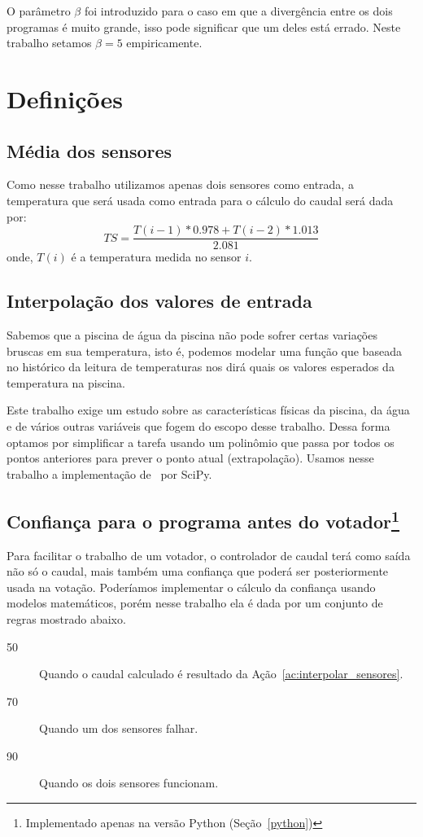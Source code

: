 \documentclass[a4paper,10pt]{article}
\begin{document}
O parâmetro $\beta$ foi introduzido para o caso em que a divergência entre os
dois programas é muito grande, isso pode significar que um deles está errado.
Neste trabalho setamos $\beta=5$ empiricamente.

\section{Definições}

\subsection{Média dos sensores}
Como nesse trabalho utilizamos apenas dois sensores como entrada, a temperatura
que será usada como entrada para o cálculo do caudal será dada por:
\begin{equation}
TS=\frac{T(i-1)*0.978+T(i-2)*1.013}{2.081}
\label{eq:media_temp}
\end{equation}
onde,
$T(i)$ é a temperatura medida no sensor $i$.

\subsection{Interpolação dos valores de entrada}\label{sec:interpolar}
Sabemos que a piscina de água da piscina não pode sofrer certas variações
bruscas em sua temperatura, isto é, podemos modelar uma função que baseada no
histórico da leitura de temperaturas nos dirá quais os valores esperados da
temperatura na piscina.

Este trabalho exige um estudo sobre as características físicas da piscina, da
água e de vários outras variáveis que fogem do escopo desse trabalho. Dessa
forma optamos por simplificar a tarefa usando um polinômio que passa por
todos os pontos anteriores para prever o ponto atual (extrapolação). Usamos
nesse trabalho a implementação de~\cite{interpolation} por SciPy.

\subsection{Confiança para o programa antes do votador\footnote{Implementado
	apenas na versão Python (Seção~\ref{python})\label{ft:python}}}
	\label{sec:conf_python}
Para facilitar o trabalho de um votador, o controlador de caudal terá como saída
não só o caudal, mais também uma confiança que poderá ser posteriormente usada na
votação. Poderíamos implementar o cálculo da confiança usando modelos
matemáticos, porém nesse trabalho ela é dada por um conjunto de regras mostrado
abaixo.
\begin{description}%
	\item[50] Quando o caudal calculado é resultado da
		Ação~\ref{ac:interpolar_sensores}.
	\item[70] Quando um dos sensores falhar.
	\item[90] Quando os dois sensores funcionam.
\end{description}
\end{document}
